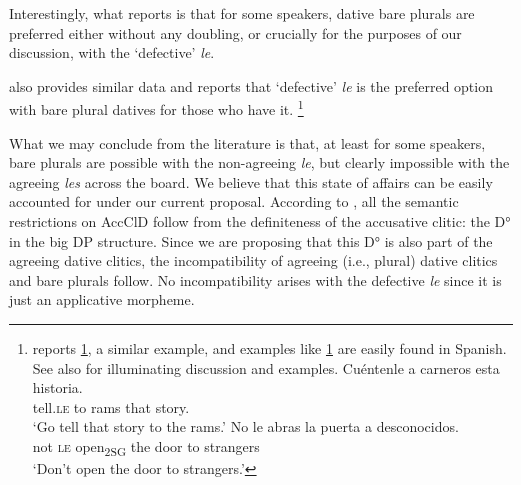 \documentclass[output=paper,colorlinks,citecolor=brown,
]{langscibook}
\begin{document}


Interestingly, what \citet{roca1992} reports is that for some speakers, dative bare plurals are preferred either without any doubling, or crucially for the purposes of our discussion, with the ‘defective’ \textit{le}. 




\citet[909]{laca1999} also provides similar data and reports that ‘defective’ \textit{le} is the preferred option with bare plural datives for those who have it.
\footnote{\textrm{ \citet{kany1945} reports \ref{ex:ausin:defectivele-i}, a similar example, and examples like \ref{ex:ausin:defectivele-ii} are easily found in Spanish. See also \citet{laca1997sustantivos} for illuminating discussion and examples. }
\ea \label{ex:ausin:defectivele}
\ea \label{ex:ausin:defectivele-i}
\gll Cuéntenle a carneros esta historia.\\
 tell.\textsc{le} to rams that story.\\
\glt `Go tell that story to the rams.'
\ex \label{ex:ausin:defectivele-ii}
\gll No le abras la puerta a desconocidos. \\
not \textsc{le} open\textsubscript{2SG} the door to strangers \\
\glt `Don’t open the door to strangers.' 
\z
\z}




What we may conclude from the literature is that, at least for some speakers, bare plurals are possible with the non-agreeing \textit{le}, but clearly impossible with the agreeing \textit{les }across the board. We believe that this state of affairs can be easily accounted for under our current proposal. According to \citet{leonetti2008}, all the semantic restrictions on AccClD follow from the definiteness of the accusative clitic: the D° in the big DP structure. Since we are proposing that this D° is also part of the agreeing dative clitics, the incompatibility of agreeing (i.e., plural) dative clitics and bare plurals follow. No incompatibility arises with the defective \textit{le} since it is just an applicative morpheme. \ 
\end{document}
